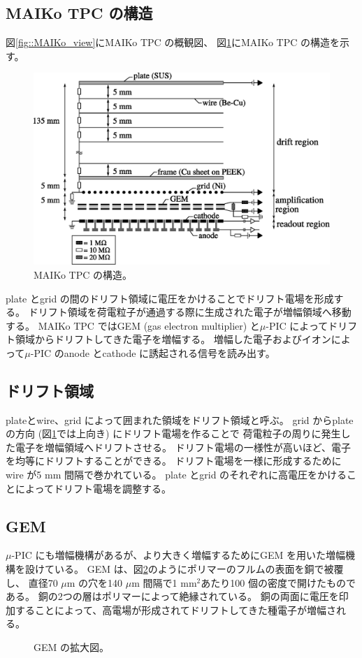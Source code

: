 \subsection{MAIKo TPC の構造}
図\ref{fig::MAIKo_view}にMAIKo TPC の概観図、
図\ref{fig::MAIKo_cage}にMAIKo TPC の構造を示す。
\begin{figure}
  \centering
  \includegraphics[clip, width=\columnwidth]{eps/MAIKo_cage.eps}
  \caption{MAIKo TPC の構造。}
  \label{fig::MAIKo_cage}
\end{figure}
plate とgrid の間のドリフト領域に電圧をかけることでドリフト電場を形成する。
ドリフト領域を荷電粒子が通過する際に生成された電子が増幅領域へ移動する。
MAIKo TPC ではGEM (gas electron multiplier) と$\mu$-PIC によってドリフト領域からドリフトしてきた電子を増幅する。
増幅した電子およびイオンによって$\mu$-PIC のanode とcathode に誘起される信号を読み出す。

\subsection{ドリフト領域}
plateとwire、grid によって囲まれた領域をドリフト領域と呼ぶ。
grid からplate の方向 (図\ref{fig::MAIKo_cage}では上向き) にドリフト電場を作ることで
荷電粒子の周りに発生した電子を増幅領域へドリフトさせる。
ドリフト電場の一様性が高いほど、電子を均等にドリフトすることができる。
ドリフト電場を一様に形成するためにwire が5 mm 間隔で巻かれている。
plate とgrid のそれぞれに高電圧をかけることによってドリフト電場を調整する。

\subsection{GEM}
$\mu$-PIC にも増幅機構があるが、より大きく増幅するためにGEM を用いた増幅機構を設けている。
GEM は、図\ref{pic::GEM}のようにポリマーのフルムの表面を銅で被覆し、
直径70 $\mu$m の穴を140 $\mu$m 間隔で1 mm$^2$あたり100 個の密度で開けたものである。
銅の2つの層はポリマーによって絶縁されている。
銅の両面に電圧を印加することによって、高電場が形成されてドリフトしてきた種電子が増幅される。
\begin{figure}
  \centering
  \caption{GEM の拡大図。}
  \label{pic::GEM}
\end{figure}

